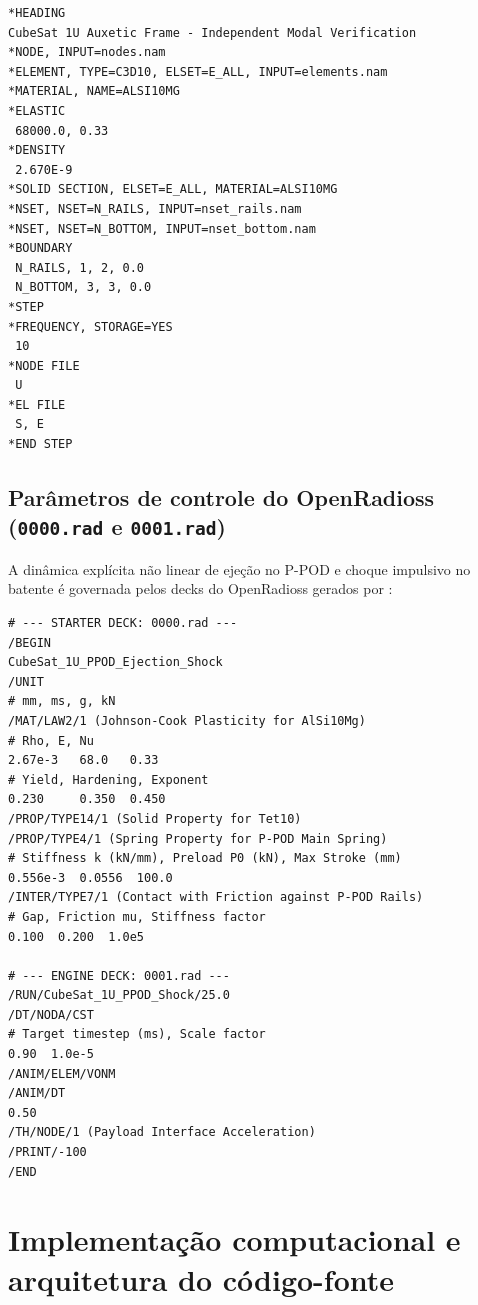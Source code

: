 \begin{apendicesenv}
\begin{lstlisting}[caption={Deck CalculiX (.inp) para verificação modal com elementos C3D10}, label={lst:calculix-inp}]
*HEADING
CubeSat 1U Auxetic Frame - Independent Modal Verification
*NODE, INPUT=nodes.nam
*ELEMENT, TYPE=C3D10, ELSET=E_ALL, INPUT=elements.nam
*MATERIAL, NAME=ALSI10MG
*ELASTIC
 68000.0, 0.33
*DENSITY
 2.670E-9
*SOLID SECTION, ELSET=E_ALL, MATERIAL=ALSI10MG
*NSET, NSET=N_RAILS, INPUT=nset_rails.nam
*NSET, NSET=N_BOTTOM, INPUT=nset_bottom.nam
*BOUNDARY
 N_RAILS, 1, 2, 0.0
 N_BOTTOM, 3, 3, 0.0
*STEP
*FREQUENCY, STORAGE=YES
 10
*NODE FILE
 U
*EL FILE
 S, E
*END STEP
\end{lstlisting}

\section{Parâmetros de controle do OpenRadioss (\texttt{0000.rad} e \texttt{0001.rad})}
\label{sec:rad-openradioss}

A dinâmica explícita não linear de ejeção no P-POD e choque impulsivo no batente é governada pelos decks do OpenRadioss gerados por :

\begin{lstlisting}[caption={Starter e Engine decks do OpenRadioss para simulação de choque de ejeção}, label={lst:openradioss-rad}]
# --- STARTER DECK: 0000.rad ---
/BEGIN
CubeSat_1U_PPOD_Ejection_Shock
/UNIT
# mm, ms, g, kN
/MAT/LAW2/1 (Johnson-Cook Plasticity for AlSi10Mg)
# Rho, E, Nu
2.67e-3   68.0   0.33
# Yield, Hardening, Exponent
0.230     0.350  0.450
/PROP/TYPE14/1 (Solid Property for Tet10)
/PROP/TYPE4/1 (Spring Property for P-POD Main Spring)
# Stiffness k (kN/mm), Preload P0 (kN), Max Stroke (mm)
0.556e-3  0.0556  100.0
/INTER/TYPE7/1 (Contact with Friction against P-POD Rails)
# Gap, Friction mu, Stiffness factor
0.100  0.200  1.0e5

# --- ENGINE DECK: 0001.rad ---
/RUN/CubeSat_1U_PPOD_Shock/25.0
/DT/NODA/CST
# Target timestep (ms), Scale factor
0.90  1.0e-5
/ANIM/ELEM/VONM
/ANIM/DT
0.50
/TH/NODE/1 (Payload Interface Acceleration)
/PRINT/-100
/END
\end{lstlisting}

\chapter{Implementação computacional e arquitetura do código-fonte}
\label{chap:apendice_codigo}


\end{apendicesenv}
